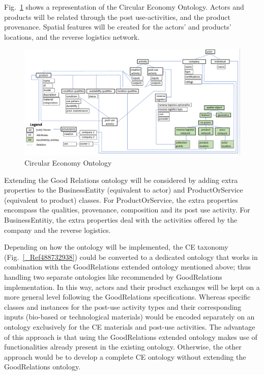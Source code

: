 \documentclass[runningheads,a4paper]{llncs}
\makeatletter
\def\maxwidth#1{\ifdim\Gin@nat@width>#1 #1\else\Gin@nat@width\fi}
\makeatother
\begin{document}
Fig.~\ref{_Ref490855958} shows a representation of the Circular Economy Ontology.  Actors and products will be related through the post use-activities, and the product provenance. Spatial features will be created for the actors' and products' locations, and the reverse logistics network.
\begin{figure}[h!]
\centering
\includegraphics[width=\maxwidth{\textwidth}]{./img/image2.png}
\cprotect\caption{Circular Economy Ontology}
\label{_Ref490855958}
\end{figure}


Extending the Good Relations  \cite{_Ref490914813} ontology will be considered by adding extra properties to the BusinessEntity (equivalent to actor) and ProductOrService (equivalent to product) classes. For ProductOrService, the extra properties encompass the qualities, provenance, composition and its post use activity. For BusinessEntitiy, the extra properties deal with the activities offered by the company and the reverse logistics. 

Depending on how the ontology will be implemented, the CE taxonomy (Fig.~\ref{_Ref488732938}) could be converted to a dedicated ontology that works in combination with the GoodRelations extended ontology mentioned above; thus handling two separate ontologies like recommended by GoodRelations implementation. In this way, actors and their product exchanges will be kept on a more general level following the GoodRelations specifications. Whereas specific classes and instances for the post-use activity types and their corresponding inputs (bio-based or technological materials) would be encoded separately on an ontology exclusively for the CE materials and post-use activities. The advantage of this approach is that using the GoodRelations extended ontology makes use of functionalities already present in the existing ontology. Otherwise, the other approach would be to develop a complete CE ontology without extending the GoodRelations ontology. 
\end{document}
